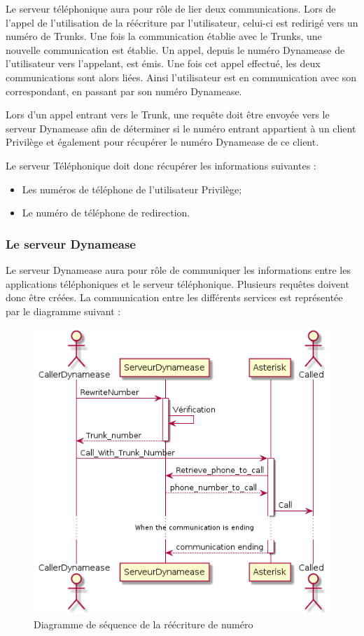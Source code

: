 Le serveur téléphonique aura pour rôle de lier deux communications. Lors de l'appel de l'utilisation de la réécriture par l'utilisateur, celui-ci est redirigé vers un numéro de Trunks. Une fois la communication établie avec le Trunks, une nouvelle communication est établie. Un appel, depuis le numéro Dynamease de l'utilisateur vers l'appelant, est émis. Une fois cet appel effectué, les deux communications sont alors liées. Ainsi l'utilisateur est en communication avec son correspondant, en passant par son numéro Dynamease.

Lors d'un appel entrant vers le Trunk, une requête doit être envoyée vers le serveur Dynamease afin de déterminer si le numéro entrant appartient à un client Privilège et également pour récupérer le numéro Dynamease de ce client.

Le serveur Téléphonique doit donc récupérer les informations suivantes :

\begin{itemize}
	\item Les numéros de téléphone de l'utilisateur Privilège;
	\item Le numéro de téléphone de redirection.
\end{itemize}
 

\subsubsection{Le serveur Dynamease}

Le serveur Dynamease aura pour rôle de communiquer les informations entre les applications téléphoniques et le serveur téléphonique. Plusieurs requêtes doivent donc être créées. La communication entre les différents services est représentée par le diagramme suivant :\\

\begin{figure}[!h]
	\centering
	\includegraphics[scale=0.8]{img/sequence_rewirte.png}
	\caption{\label{sequence_rewirte} Diagramme de séquence de la réécriture de numéro}
\end{figure}

